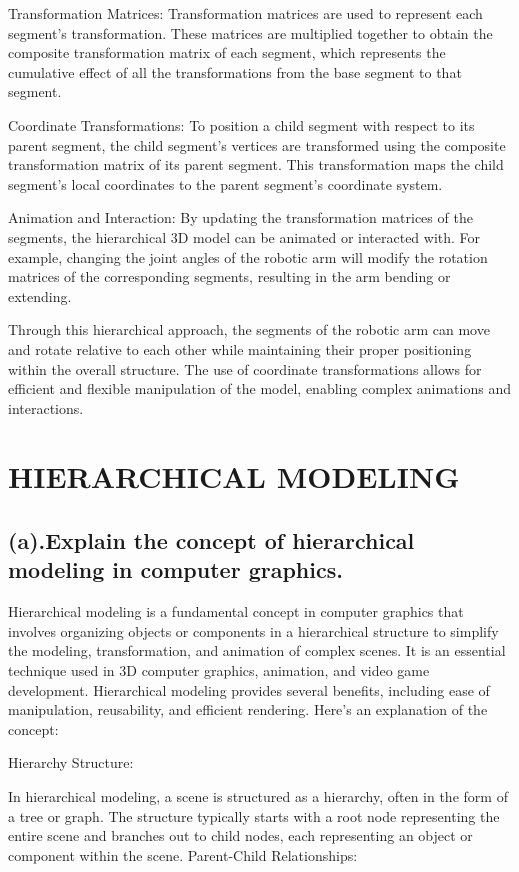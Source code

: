 \documentclass{article}
\begin{document}
\begin{itemize}
Transformation Matrices: Transformation matrices are used to represent each segment's transformation. These matrices are multiplied together to obtain the composite transformation matrix of each segment, which represents the cumulative effect of all the transformations from the base segment to that segment.

Coordinate Transformations: To position a child segment with respect to its parent segment, the child segment's vertices are transformed using the composite transformation matrix of its parent segment. This transformation maps the child segment's local coordinates to the parent segment's coordinate system.

Animation and Interaction: By updating the transformation matrices of the segments, the hierarchical 3D model can be animated or interacted with. For example, changing the joint angles of the robotic arm will modify the rotation matrices of the corresponding segments, resulting in the arm bending or extending.

Through this hierarchical approach, the segments of the robotic arm can move and rotate relative to each other while maintaining their proper positioning within the overall structure. The use of coordinate transformations allows for efficient and flexible manipulation of the model, enabling complex animations and interactions.
 \section{HIERARCHICAL MODELING}
\subsection{(a).Explain the concept of hierarchical modeling in computer graphics.}
Hierarchical modeling is a fundamental concept in computer graphics that involves organizing objects or components in a hierarchical structure to simplify the modeling, transformation, and animation of complex scenes. It is an essential technique used in 3D computer graphics, animation, and video game development. Hierarchical modeling provides several benefits, including ease of manipulation, reusability, and efficient rendering. Here's an explanation of the concept:

Hierarchy Structure:

In hierarchical modeling, a scene is structured as a hierarchy, often in the form of a tree or graph. The structure typically starts with a root node representing the entire scene and branches out to child nodes, each representing an object or component within the scene.
Parent-Child Relationships:


\end{itemize}
\end{document}
